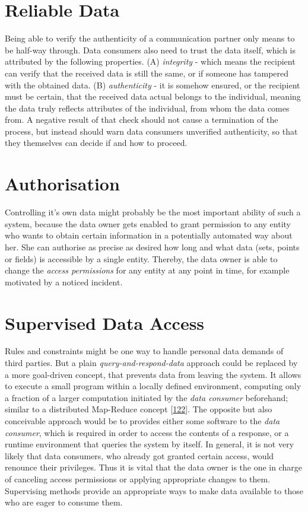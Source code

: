\documentclass[12pt,english,a4paper,titlepage,cleardoublepage=empty,dottedtoc]{report}
\begin{document}
\section{Reliable Data}\label{reliable-data}

Being able to verify the authenticity of a communication partner only
means to be half-way through. Data consumers also need to trust the data
itself, which is attributed by the following properties. (A)
\emph{integrity} - which means the recipient can verify that the
received data is still the same, or if someone has tampered with the
obtained data. (B) \emph{authenticity} - it is somehow ensured, or the
recipient must be certain, that the received data actual belongs to the
individual, meaning the data truly reflects attributes of the
individual, from whom the data comes from. A negative result of that
check should not cause a termination of the process, but instead should
warn data consumers unverified authenticity, so that they themselves can
decide if and how to proceed.

\section{Authorisation}\label{authorisation}

Controlling it's own data might probably be the most important ability
of such a system, because the data owner gets enabled to grant
permission to any entity who wants to obtain certain information in a
potentially automated way about her. She can authorise as precise as
desired how long and what data (sets, points or fields) is accessible by
a single entity. Thereby, the data owner is able to change the
\emph{access permissions} for any entity at any point in time, for
example motivated by a noticed incident.

\hypertarget{supervised-data-access}{\section{Supervised Data
Access}\label{supervised-data-access}}

Rules and constraints might be one way to handle personal data demands
of third parties. But a plain \emph{query-and-respond-data} approach
could be replaced by a more goal-driven concept, that prevents data from
leaving the system. It allows to execute a small program within a
locally defined environment, computing only a fraction of a larger
computation initiated by the \emph{data consumer} beforehand; similar to
a distributed Map-Reduce concept
{[}\protect\hyperlink{ref-paper_2004_distributed-mapreduce}{122}{]}. The
opposite but also conceivable approach would be to provides either some
software to the \emph{data consumer}, which is required in order to
access the contents of a response, or a runtime environment that queries
the system by itself. In general, it is not very likely that data
consumers, who already got granted certain access, would renounce their
privileges. Thus it is vital that the data owner is the one in charge of
canceling access permissions or applying appropriate changes to them.
Supervising methods provide an appropriate ways to make data available
to those who are eager to consume them.
\end{document}
